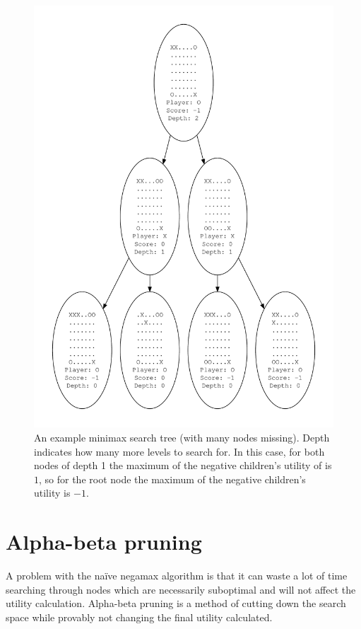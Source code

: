 \documentclass[12pt]{article}
\begin{document}
\begin{figure}\begin{center}\includegraphics[scale=0.5]{negamax}\end{center}\caption{An example minimax search tree (with many nodes missing).  Depth indicates how many more levels to search for.  In this case, for both nodes of depth 1 the maximum of the negative children's utility of is $1$, so for the root node the maximum of the negative children's utility is $-1$.}\end{figure}

\section{Alpha-beta pruning}
A problem with the na\"ive negamax algorithm is that it can waste a lot of time searching through nodes which are necessarily suboptimal and will not affect the utility calculation.  Alpha-beta pruning \cite{hart} is a method of cutting down the search space while provably not changing the final utility calculated.
\end{document}
